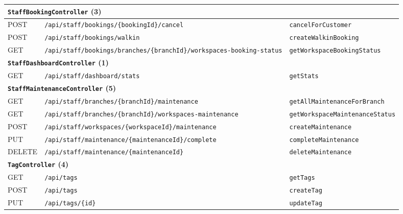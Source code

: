 {\begin{longtable}{|p{1.5cm}|p{7.3cm}|p{5.0cm}|}
\hline
\multicolumn{3}{|l|}{\textbf{\texttt{StaffBookingController} (3)}} \\
\hline
POST & \texttt{/\allowbreak api/\allowbreak staff/\allowbreak bookings/\allowbreak \{bookingId\}/\allowbreak cancel} & \texttt{cancelForCustomer} \\
\hline
POST & \texttt{/\allowbreak api/\allowbreak staff/\allowbreak bookings/\allowbreak walkin} & \texttt{createWalkinBooking} \\
\hline
GET & \texttt{/\allowbreak api/\allowbreak staff/\allowbreak bookings/\allowbreak branches/\allowbreak \{branchId\}/\allowbreak workspaces-booking-status} & \texttt{getWorkspaceBookingStatus} \\
\hline
\multicolumn{3}{|l|}{\textbf{\texttt{StaffDashboardController} (1)}} \\
\hline
GET & \texttt{/\allowbreak api/\allowbreak staff/\allowbreak dashboard/\allowbreak stats} & \texttt{getStats} \\
\hline
\multicolumn{3}{|l|}{\textbf{\texttt{StaffMaintenanceController} (5)}} \\
\hline
GET & \texttt{/\allowbreak api/\allowbreak staff/\allowbreak branches/\allowbreak \{branchId\}/\allowbreak maintenance} & \texttt{getAllMaintenanceForBranch} \\
\hline
GET & \texttt{/\allowbreak api/\allowbreak staff/\allowbreak branches/\allowbreak \{branchId\}/\allowbreak workspaces-maintenance} & \texttt{getWorkspaceMaintenanceStatus} \\
\hline
POST & \texttt{/\allowbreak api/\allowbreak staff/\allowbreak workspaces/\allowbreak \{workspaceId\}/\allowbreak maintenance} & \texttt{createMaintenance} \\
\hline
PUT & \texttt{/\allowbreak api/\allowbreak staff/\allowbreak maintenance/\allowbreak \{maintenanceId\}/\allowbreak complete} & \texttt{completeMaintenance} \\
\hline
DELETE & \texttt{/\allowbreak api/\allowbreak staff/\allowbreak maintenance/\allowbreak \{maintenanceId\}} & \texttt{deleteMaintenance} \\
\hline
\multicolumn{3}{|l|}{\textbf{\texttt{TagController} (4)}} \\
\hline
GET & \texttt{/\allowbreak api/\allowbreak tags} & \texttt{getTags} \\
\hline
POST & \texttt{/\allowbreak api/\allowbreak tags} & \texttt{createTag} \\
\hline
PUT & \texttt{/\allowbreak api/\allowbreak tags/\allowbreak \{id\}} & \texttt{updateTag} \\

\end{longtable}}
